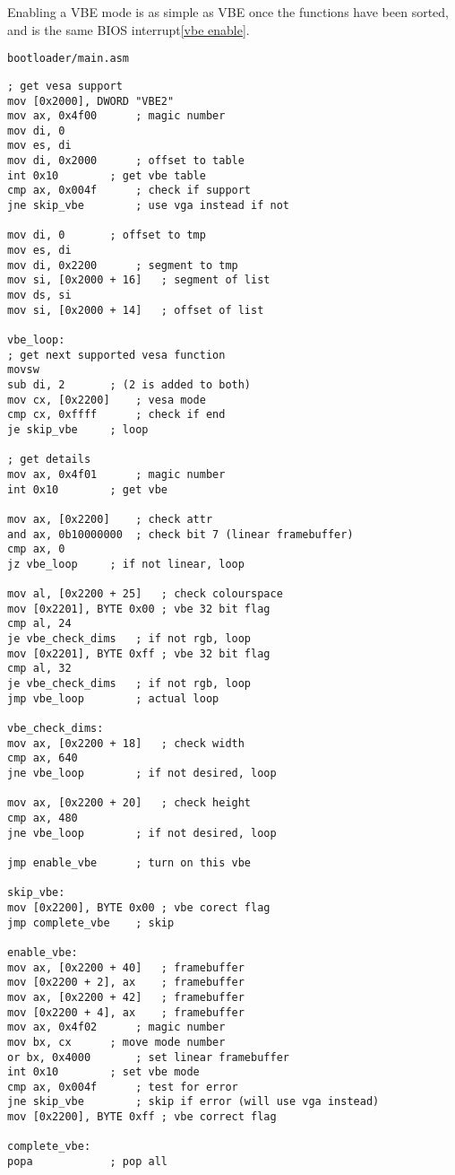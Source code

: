 \documentclass{article}
\begin{document}
Enabling a VBE mode is as simple as VBE once the functions have been sorted, and
is the same BIOS interrupt\ref{vbe enable}.

\begin{verbatim}
bootloader/main.asm
\end{verbatim}
\begin{verbatim}
; get vesa support
mov [0x2000], DWORD "VBE2"
mov ax, 0x4f00		; magic number
mov di, 0
mov es, di
mov di, 0x2000		; offset to table
int 0x10		; get vbe table
cmp ax, 0x004f		; check if support
jne skip_vbe		; use vga instead if not

mov di, 0		; offset to tmp
mov es, di
mov di, 0x2200		; segment to tmp
mov si, [0x2000 + 16]	; segment of list
mov ds, si
mov si, [0x2000 + 14]	; offset of list

vbe_loop:
; get next supported vesa function
movsw
sub di, 2		; (2 is added to both)
mov cx, [0x2200]	; vesa mode
cmp cx, 0xffff		; check if end
je skip_vbe		; loop

; get details
mov ax, 0x4f01		; magic number
int 0x10		; get vbe

mov ax, [0x2200]	; check attr
and ax, 0b10000000	; check bit 7 (linear framebuffer)
cmp ax, 0
jz vbe_loop		; if not linear, loop

mov al, [0x2200 + 25]	; check colourspace
mov [0x2201], BYTE 0x00	; vbe 32 bit flag
cmp al, 24
je vbe_check_dims	; if not rgb, loop
mov [0x2201], BYTE 0xff	; vbe 32 bit flag
cmp al, 32
je vbe_check_dims	; if not rgb, loop
jmp vbe_loop		; actual loop

vbe_check_dims:
mov ax, [0x2200 + 18]	; check width
cmp ax, 640
jne vbe_loop		; if not desired, loop

mov ax, [0x2200 + 20]	; check height
cmp ax, 480
jne vbe_loop		; if not desired, loop

jmp enable_vbe		; turn on this vbe

skip_vbe:
mov [0x2200], BYTE 0x00	; vbe corect flag
jmp complete_vbe	; skip

enable_vbe:
mov ax, [0x2200 + 40]	; framebuffer
mov [0x2200 + 2], ax	; framebuffer
mov ax, [0x2200 + 42]	; framebuffer
mov [0x2200 + 4], ax	; framebuffer
mov ax, 0x4f02		; magic number
mov bx, cx		; move mode number
or bx, 0x4000		; set linear framebuffer
int 0x10		; set vbe mode
cmp ax, 0x004f		; test for error
jne skip_vbe		; skip if error (will use vga instead)
mov [0x2200], BYTE 0xff	; vbe correct flag

complete_vbe:
popa			; pop all
\end{verbatim}
\end{document}

